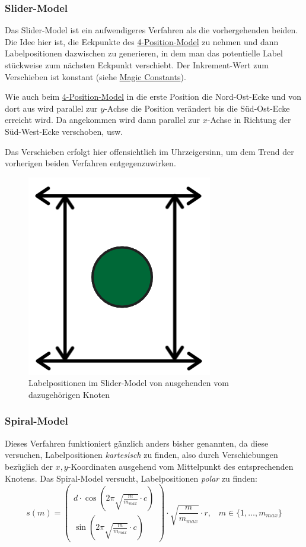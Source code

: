 \subsubsection{Slider-Model}
\label{subsubsec:slider}
Das Slider-Model ist ein aufwendigeres Verfahren als die vorhergehenden beiden. Die Idee hier ist, die Eckpunkte des \hyperref[subsubsec:4pos]{4-Position-Model} zu nehmen
und dann Labelpositionen dazwischen zu generieren, in dem man das potentielle Label stückweise zum nächsten Eckpunkt verschiebt. Der Inkrement-Wert zum Verschieben ist konstant (siehe \hyperref[subsec:consts]{Magic Constants}).

Wie auch beim \hyperref[subsubsec:4pos]{4-Position-Model} in die erste Position die Nord-Ost-Ecke und von dort aus wird parallel zur $y$-Achse die Position verändert bis die Süd-Ost-Ecke erreicht wird.
Da angekommen wird dann parallel zur $x$-Achse in Richtung der Süd-West-Ecke verschoben, usw.

Das Verschieben erfolgt hier offensichtlich im Uhrzeigersinn, um dem Trend der vorherigen beiden Verfahren entgegenzuwirken.

\begin{figure}[H]
    \centering
    \includegraphics[scale=0.55]{../img/slider}
    \caption{Labelpositionen im Slider-Model von ausgehenden vom dazugehörigen Knoten}
    \label{fig:slider}
\end{figure}

\subsubsection{Spiral-Model}
\label{subsubsec:spiral}

Dieses Verfahren funktioniert gänzlich anders bisher genannten, da diese versuchen, Labelpositionen \textit{kartesisch} zu finden, also durch Verschiebungen
bezüglich der $x,y$-Koordinaten ausgehend vom Mittelpunkt des entsprechenden Knotens. Das Spiral-Model versucht, Labelpositionen \textit{polar} zu finden:
$$ s(m) =
    \left(\begin{array}{c}
              d \cdot \cos (2 \pi \sqrt{\frac{m}{m_{max}}} \cdot c) \\
    \sin (2 \pi \sqrt{\frac{m}{m_{max}}} \cdot c)\end{array}\right) \cdot \sqrt{\frac{m}{m_{max}}} \cdot r,\; \; \; m \in \{1, \dots, m_{max} \}
$$

